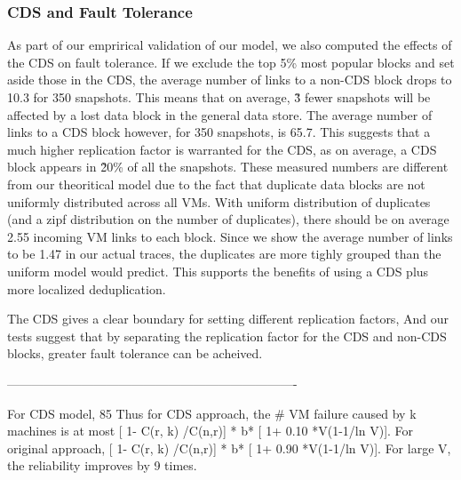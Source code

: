{\subsubsection{CDS and Fault Tolerance}
As part of our emprirical validation of our model, we also computed the effects
of the CDS on fault tolerance. If we exclude the top 5\% most popular blocks
and set aside those in the CDS, the average number of links to a non-CDS block
drops to 10.3 for 350 snapshots. This means that on average, \~3 fewer
snapshots will be affected by a lost data block in the general data store.
The average number of links to a CDS block however, for 350 snapshots, is
65.7. This suggests that a much higher replication factor is warranted for
the CDS, as on average, a CDS block appears in \~20\% of all the snapshots.
These measured numbers are different from our theoritical model due to the fact
that duplicate data blocks are not uniformly distributed across all VMs.
With uniform distribution of duplicates (and a zipf distribution on the number
of duplicates), there should be on average 2.55 incoming VM links to each
block. Since we show the average number of links to be 1.47 in our actual
traces, the duplicates are
more tighly grouped than the uniform model would predict. This supports
the benefits of using a CDS plus more localized deduplication.

The CDS gives a clear boundary for setting different replication factors,
And our tests suggest that by separating the replication factor for the CDS
and non-CDS blocks, greater fault tolerance can be acheived.

----------------------------------------------------------------------

For CDS model, 85%
Thus  for CDS approach,   the # VM failure caused by k machines is at most  [ 1-  C(r, k) /C(n,r)] * b* [ 1+ 0.10 *V(1-1/ln V)].
For original approach,  [ 1-  C(r, k) /C(n,r)] * b* [ 1+ 0.90 *V(1-1/ln V)].
For large V, the reliability improves by 9 times.
}
